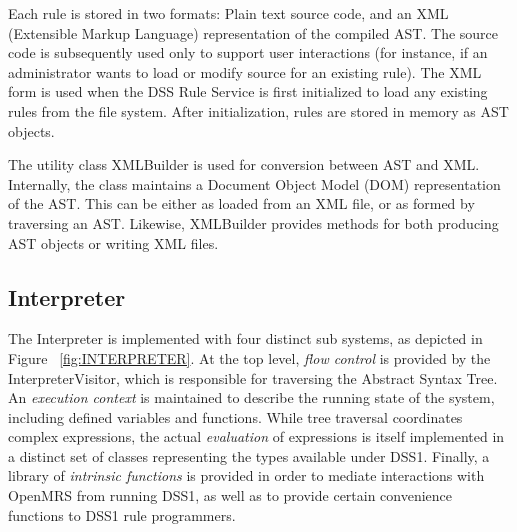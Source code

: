 \documentclass[12pt,letterpaper]{article}
\begin{document}
{Each rule is  stored in two formats: Plain text source code, and an XML (Extensible Markup Language) representation of the compiled AST. The 
source code is subsequently used only to support user interactions (for instance, if an administrator wants to load or modify source for an existing rule). The XML form is used when the DSS Rule Service is first initialized to load any existing rules from the file system. After initialization, rules are stored in memory as AST objects.

The utility class XMLBuilder is used for conversion between AST and XML. Internally, the class maintains a Document Object Model (DOM) representation of the AST. This can be either as loaded from an XML file, or as formed by traversing an AST. Likewise, XMLBuilder provides methods for both producing AST objects or writing XML files.

\subsection{Interpreter} \label{sec:INTERPRETER}

The Interpreter is implemented with four distinct sub systems, as depicted in Figure ~\ref{fig:INTERPRETER}.
At the top level, \emph{flow control} is provided by the InterpreterVisitor, which is responsible for traversing the Abstract Syntax Tree. An \emph{execution context} is maintained to describe the running state of the system, including defined variables and functions. While tree traversal coordinates complex expressions, the actual \emph{evaluation} of expressions is itself implemented in a distinct set of classes representing the types available under DSS1. Finally, a library of \emph{intrinsic functions} is provided in order to mediate interactions with OpenMRS from running DSS1, as well as to provide certain convenience functions to DSS1 rule programmers.

}
\end{document}
